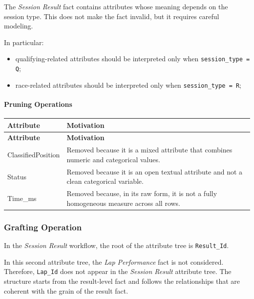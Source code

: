 \documentclass[a4paper,11pt]{article}
\begin{document}
	The \textit{Session Result} fact contains attributes whose meaning depends on the session
	type. This does not make the fact invalid, but it requires careful modeling.
	
	In particular:
	
	\begin{itemize}
		\item qualifying-related attributes should be interpreted only when
		\texttt{session\_type = Q};
		
		\item race-related attributes should be interpreted only when
		\texttt{session\_type = R};

	\end{itemize}
	
	\paragraph*{Pruning Operations}
	
	\begin{longtable}{|p{4.4cm}|p{10.8cm}|}
		\hline
		\textbf{Attribute} & \textbf{Motivation} \\
		\hline
		\endfirsthead
		
		\hline
		\textbf{Attribute} & \textbf{Motivation} \\
		\hline
		\endhead
		
		ClassifiedPosition & Removed because it is a mixed attribute that combines numeric and categorical values. \\ \hline
		
		Status & Removed because it is an open textual attribute and not a clean categorical variable. \\ \hline
		
		Time\_ms & Removed because, in its raw form, it is not a fully homogeneous measure across all rows. \\ \hline
	\end{longtable}
	


	\subsubsection{Grafting Operation}
	
	In the \textit{Session Result} workflow, the root of the attribute tree is
	\texttt{Result\_Id}.
	
	In this second attribute tree, the \textit{Lap Performance} fact is not considered.
	Therefore, \texttt{Lap\_Id} does not appear in the \textit{Session Result} attribute tree.
	The structure starts from the result-level fact and follows the relationships that are
	coherent with the grain of the result fact.
	
\end{document}
